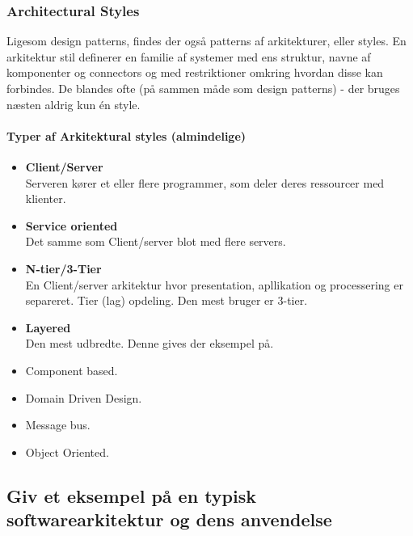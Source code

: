 \subsubsection{Architectural Styles}
Ligesom design patterns, findes der også patterns af arkitekturer, eller styles.
En arkitektur stil definerer en familie af systemer med ens struktur, navne af komponenter og connectors og med restriktioner omkring hvordan disse kan forbindes. De blandes ofte (på sammen måde som design patterns) - der bruges næsten aldrig kun én style.

\paragraph{Typer af Arkitektural styles (almindelige)}\label{sec:arcstyles}

\begin{itemize}
	\item \textbf{Client/Server}\\
	Serveren kører et eller flere programmer, som deler deres ressourcer med klienter.
	\item \textbf{Service oriented}\\
	Det samme som Client/server blot med flere servers.
	\item \textbf{N-tier/3-Tier}\\
	En Client/server arkitektur hvor presentation, apllikation og processering er separeret. Tier (lag) opdeling. Den mest bruger er 3-tier.
	\item \textbf{Layered}\\
	Den mest udbredte. Denne gives der eksempel på.
	\item Component based.
	\item Domain Driven Design.
	\item Message bus.
	\item Object Oriented.
\end{itemize}

\subsection{Giv et eksempel på en typisk softwarearkitektur og dens anvendelse}

